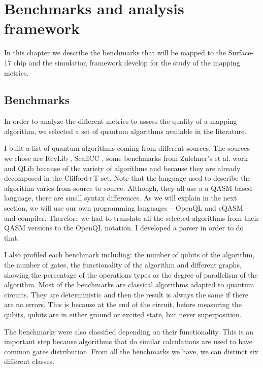 
\chapter{Benchmarks and analysis framework}
\label{sec:org17c0cef}

In this chapter we describe the benchmarks that will be mapped to the Surface-17 chip and the simulation framework develop for the study of the mapping metrics.

\section{Benchmarks}
\label{sec:orga02804b}
In order to analyze the different metrics to assess the quality of a mapping algorithm, we selected a set of quantum algorithms available in the literature.

I built a list of quantum algorithms coming from different sources.
The sources we chose are RevLib \cite{Wille_2008}, ScaffCC \cite{JavadiAbhari_2015}, some benchmarks from Zulehner's et al. work \cite{zulehner17:effic_method_mappin_quant_circuit} and QLib \cite{Lin_2014} because of the variety of algorithms and because they are already decomposed in the Clifford+T set.
Note that the language used to describe the algorithm varies from source to source.
Although, they all use a  a QASM-based language, there are small syntax differences.
As we will explain in the next section, we will use our own programming languages -- OpenQL and cQASM -- and compiler.
Therefore we had to translate all the selected algorithms from their QASM versions to the OpenQL notation.
I developed a parser in order to do that.

I also profiled each benchmark including: the number of qubits of the algorithm, the number of gates, the functionality of the algorithm and different graphs, showing the percentage of the operations types or the degree of parallelism of the algorithm.
Most of the benchmarks are classical algorithms adapted to quantum circuits.
They are deterministic and then the result is always the same if there are no errors.
This is because  at the end of the circuit, before measuring the qubits, qubits are in either ground or excited state, but never superposition.


The benchmarks were also classified depending on their functionality.
This is an important step because algorithms that do similar calculations are used to have common gates distribution.
From all the benchmarks we have, we can distinct six different classes.

